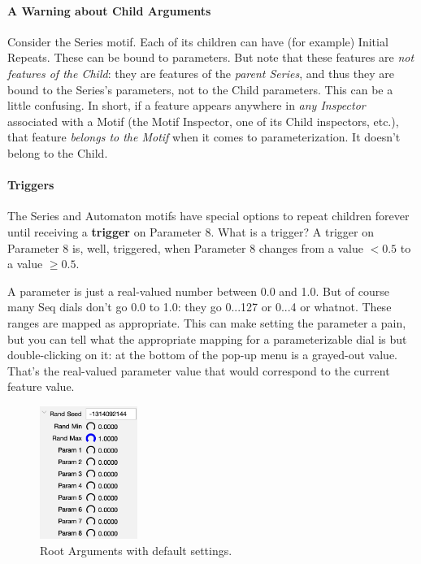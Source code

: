 \documentclass[twoside,10pt]{article}
\begin{document}
\paragraph{A Warning about Child Arguments}

Consider the Series motif. Each of its children can have (for example) Initial Repeats.  These can be bound to parameters.  But note that these features are {\it not features of the Child}: they are features of the {\it parent Series}, and thus they are bound to the Series's parameters, not to the Child parameters.  This can be a little confusing.  In short, if a feature appears anywhere in {\it any Inspector} associated with a Motif (the Motif Inspector, one of its Child inspectors, etc.), that feature {\it belongs to the Motif} when it comes to parameterization.  It doesn't belong to the Child.

\paragraph{Triggers} The Series and Automaton motifs have special options to repeat children forever until receiving a {\bf trigger} on Parameter 8.  What is a trigger?  A trigger on Parameter 8 is, well, triggered, when Parameter 8 changes from a value \(< 0.5\) to a value \(\geq 0.5\). 


A parameter is just a real-valued number between 0.0 and 1.0.  But of course many Seq dials don't go 0.0 to 1.0: they go 0...127 or 0...4 or whatnot.  These ranges are mapped  as appropriate.  This can make setting the parameter a pain, but you can tell what the appropriate mapping for a parameterizable dial is but double-clicking on it: at the bottom of the pop-up menu is a grayed-out value. That's the real-valued parameter value that would correspond to the current feature value.    


\begin{figure}
\vspace{-1em}
\includegraphics[width=1.25in]{rootarguments}
\caption{Root Arguments with default settings.}
\label{rootarguments}
\end{figure}
\end{document}
